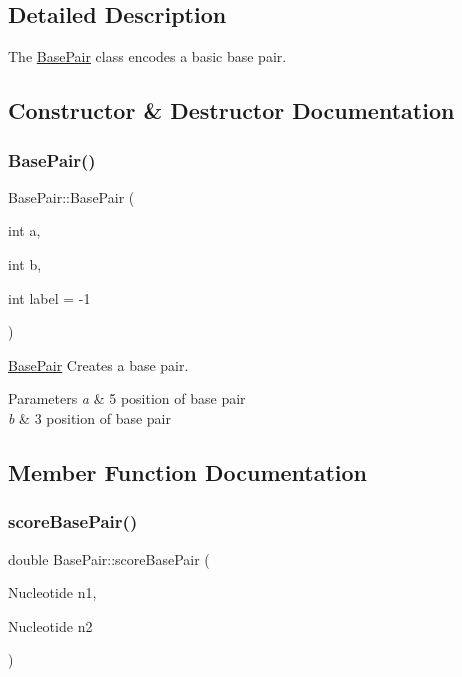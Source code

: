\subsection{Detailed Description}
The \hyperlink{class_base_pair}{Base\+Pair} class encodes a basic base pair. 

\subsection{Constructor \& Destructor Documentation}
\mbox{\label{class_base_pair_ae11e048c14320d131209d1cc2f269420}} 
\subsubsection{\texorpdfstring{Base\+Pair()}{BasePair()}}
{\footnotesize\ttfamily Base\+Pair\+::\+Base\+Pair (\begin{DoxyParamCaption}\item[{int}]{a,  }\item[{int}]{b,  }\item[{int}]{label = {\ttfamily -\/1} }\end{DoxyParamCaption})}



\hyperlink{class_base_pair}{Base\+Pair} Creates a base pair. 


\begin{DoxyParams}{Parameters}
{\em a} & 5\textquotesingle{} position of base pair \\
\hline
{\em b} & 3\textquotesingle{} position of base pair \\
\hline
\end{DoxyParams}


\subsection{Member Function Documentation}
\mbox{\label{class_base_pair_a2f21c1f146b7dd0c164de88710cebde8}} 
\subsubsection{\texorpdfstring{score\+Base\+Pair()}{scoreBasePair()}}
{\footnotesize\ttfamily double Base\+Pair\+::score\+Base\+Pair (\begin{DoxyParamCaption}\item[{Nucleotide}]{n1,  }\item[{Nucleotide}]{n2 }\end{DoxyParamCaption})}



